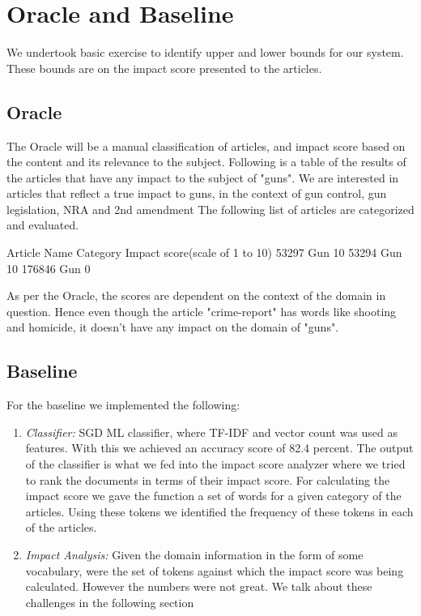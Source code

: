 \documentclass{article}
\begin{document}

\section{Oracle and Baseline} %

We undertook basic exercise to identify upper and lower bounds for our system. These bounds are on the impact score presented to the articles.

\subsection{Oracle}
The Oracle will be a manual classification of articles, and impact score based on the content and its relevance to the subject.
Following is a table of the results of the articles that have any impact to the subject of "guns".
We are interested in articles that reflect a true impact to guns, in the context of gun control, gun legislation, NRA and 2nd amendment
The following list of articles are categorized and evaluated.

Article Name    Category    Impact score(scale of 1 to 10)
53297           Gun    10
53294           Gun    10
176846         Gun    0

As per the Oracle, the scores are dependent on the context of the domain in question.
Hence even though the article "crime-report" has words like shooting and homicide, it doesn't have any impact on the domain of "guns".\newline

\subsection{Baseline}
For the baseline we implemented the following:

\begin{enumerate}
	\item \textit{Classifier:} SGD ML classifier, where TF-IDF and vector count was used as features. With this we achieved an accuracy score of 82.4 percent.
	The output of the classifier is what we fed into the impact score analyzer where we tried to rank the documents in terms of their impact score. For calculating the impact score we gave the function a set of words for a given category of the articles. Using these tokens we identified the frequency of these tokens in each of the articles. 

	\item \textit {Impact Analysis:} Given the domain information in the form of some vocabulary, were the set of tokens against which the impact score was being calculated.  However the numbers were not great. We talk about these challenges in the following section
\end{enumerate}
\end{document}
